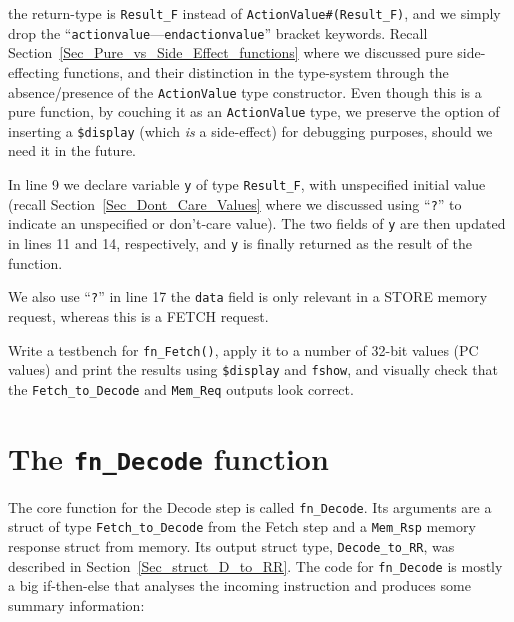 {\ie} the return-type is \verb|Result_F| instead of
\verb|ActionValue#(Result_F)|, and we simply drop the
``\verb|actionvalue|---\verb|endactionvalue|'' bracket
keywords. Recall Section~\ref{Sec_Pure_vs_Side_Effect_functions} where
we discussed pure {\vs} side-effecting functions, and their
distinction in the type-system through the absence/presence of the
\verb|ActionValue| type constructor.  Even though this is a pure
function, by couching it as an \verb|ActionValue| type, we preserve
the option of inserting a \verb|$display| (which \emph{is} a
side-effect) for debugging purposes, should we need it in the future.

In line 9 we declare variable \verb|y| of type \verb|Result_F|, with
unspecified initial value (recall Section~\ref{Sec_Dont_Care_Values}
where we discussed using ``\verb|?|'' to indicate an unspecified or
don't-care value).  The two fields of \verb|y| are then updated in
lines 11 and 14, respectively, and \verb|y| is finally returned as the
result of the function.

We also use ``\verb|?|'' in line 17 the \verb|data| field is only
relevant in a STORE memory request, whereas this is a FETCH request.


\hdivider

\Exercise

Write a testbench for \verb|fn_Fetch()|, apply it to a number of
32-bit values (PC values) and print the results using \verb|$display|
and \verb|fshow|, and visually check that the \verb|Fetch_to_Decode|
and \verb|Mem_Req| outputs look correct.

\Endexercise


\section{The {\tt fn\_Decode} function}

\label{Sec_Decode_Function}


The core function for the Decode step is called \verb|fn_Decode|.  Its
arguments are a struct of type \verb|Fetch_to_Decode| from the Fetch
step and a \verb|Mem_Rsp| memory response struct from memory.  Its
output struct type, \verb|Decode_to_RR|, was described in
Section~\ref{Sec_struct_D_to_RR}.  The code for \verb|fn_Decode| is
mostly a big if-then-else that analyses the incoming instruction and
produces some summary information:

